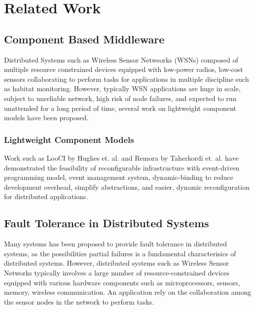 \chapter{Related Work}
\label{c:related}

\section{Component Based Middleware}

Distributed Systems such as Wireless Sensor Netweorks (WSNs) composed of
multiple resource constrained devices equipped with low-power radios, low-cost
sensors collaborating to perform tasks for applications in multiple discipline
such as habitat monitoring. However, typically WSN applications are huge in
scale, subject to unreliable network, high risk of node failures, and expected
to run unattended for a long period of time, several work on lightweight component
models have been proposed\cite{Costa2007}\cite{Gay2003}\cite{Coulson2008}.

\subsection{Lightweight Component Models}

Work such as LooCI by Hughes et. al.\cite{Hughes2012} and Remora by Taherkordi
et. al.\cite{Taherkordi2010a} have demonstrated the feasibility of
reconfigurable infrastructure with event-driven programming model, event
management system, dynamic-binding to reduce development overhead, simplify
abstractions, and easier, dynamic reconfiguration for distributed applications.

\section{Fault Tolerance in Distributed Systems}

Many systems has been proposed to provide fault tolerance in distributed
systems, as the possibilities partial failures is a fundamental characterisics
of distributed systems.
However, distributed systems such as Wireless Sensor Networks typically
involves a large number of resource-constrained devices equipped with various
hardware components such as microprocessors, sensors, memory, wireless
communication. An application rely on the collaboration among the sensor nodes in
the network to perform tasks.



